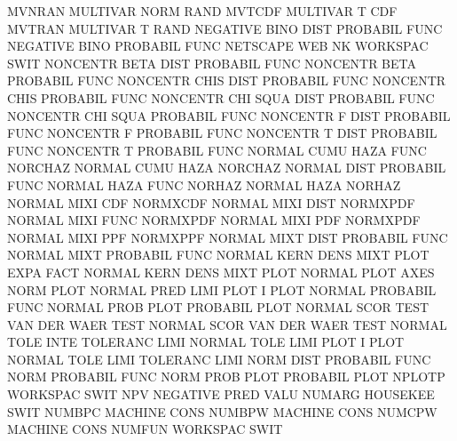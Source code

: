 MVNRAN                                  MULTIVAR NORM RAND
MVTCDF                                  MULTIVAR T    CDF
MVTRAN                                  MULTIVAR T    RAND
NEGATIVE BINO DIST                      PROBABIL FUNC
NEGATIVE BINO                           PROBABIL FUNC
NETSCAPE                                WEB
NK                                      WORKSPAC SWIT
NONCENTR BETA DIST                      PROBABIL FUNC
NONCENTR BETA                           PROBABIL FUNC
NONCENTR CHIS DIST                      PROBABIL FUNC
NONCENTR CHIS                           PROBABIL FUNC
NONCENTR CHI  SQUA DIST                 PROBABIL FUNC
NONCENTR CHI  SQUA                      PROBABIL FUNC
NONCENTR F    DIST                      PROBABIL FUNC
NONCENTR F                              PROBABIL FUNC
NONCENTR T    DIST                      PROBABIL FUNC
NONCENTR T                              PROBABIL FUNC
NORMAL   CUMU HAZA FUNC                 NORCHAZ
NORMAL   CUMU HAZA                      NORCHAZ
NORMAL   DIST                           PROBABIL FUNC
NORMAL   HAZA FUNC                      NORHAZ
NORMAL   HAZA                           NORHAZ
NORMAL   MIXI CDF                       NORMXCDF
NORMAL   MIXI DIST                      NORMXPDF
NORMAL   MIXI FUNC                      NORMXPDF
NORMAL   MIXI PDF                       NORMXPDF
NORMAL   MIXI PPF                       NORMXPPF
NORMAL   MIXT DIST                      PROBABIL FUNC
NORMAL   MIXT                           PROBABIL FUNC
NORMAL   KERN DENS MIXT PLOT EXPA FACT  NORMAL   KERN DENS MIXT PLOT
NORMAL   PLOT AXES                      NORM     PLOT
NORMAL   PRED LIMI PLOT                 I        PLOT
NORMAL                                  PROBABIL FUNC
NORMAL   PROB PLOT                      PROBABIL PLOT
NORMAL   SCOR TEST                      VAN      DER  WAER TEST
NORMAL   SCOR                           VAN      DER  WAER TEST
NORMAL   TOLE INTE                      TOLERANC LIMI
NORMAL   TOLE LIMI PLOT                 I        PLOT
NORMAL   TOLE LIMI                      TOLERANC LIMI
NORM     DIST                           PROBABIL FUNC
NORM                                    PROBABIL FUNC
NORM     PROB PLOT                      PROBABIL PLOT
NPLOTP                                  WORKSPAC SWIT
NPV                                     NEGATIVE PRED VALU
NUMARG                                  HOUSEKEE SWIT
NUMBPC                                  MACHINE  CONS
NUMBPW                                  MACHINE  CONS
NUMCPW                                  MACHINE  CONS
NUMFUN                                  WORKSPAC SWIT
